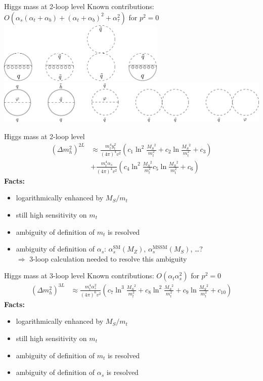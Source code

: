 \documentclass[hyperref={pdfpagelabels=false},ngerman]{beamer}
\newcommand{\MS}{\ensuremath{M_S}}
\renewcommand{\emph}{\textbf}
\newcommand{\SM}{\ensuremath{\text{SM}}}
\newcommand{\MSSM}{\ensuremath{\text{MSSM}}}
\newcommand{\at}{\alpha_t}
\newcommand{\ab}{\alpha_b}
\newcommand{\atau}{\alpha_\tau}
\newcommand{\as}{\alpha_s}
\begin{document}
\begin{frame}{Higgs mass at 2-loop level}
  Known contributions: $O(\as (\at + \ab) + (\at+\ab)^2 + \atau^2)$ for $p^2 = 0$
  \\[1em]
  \includegraphics[width=0.6\textwidth]{images/atas}\\[1em]
  \includegraphics[width=\textwidth]{images/atat}
\end{frame}

\begin{frame}{Higgs mass at 2-loop level}
  \begin{align*}
    (\Delta m_h^2)^{2L} &\approx
    \frac{m_t^4 y_t^2}{(4\pi)^4 v^2} \left(
      c_1 \ln^2\frac{\MS^2}{m_t^2}
      + c_2 \ln\frac{\MS^2}{m_t^2}
      + c_3
    \right) \\
    & +
    \frac{m_t^4 \as}{(4\pi)^4 v^2} \left(
      c_4 \ln^2\frac{\MS^2}{m_t^2}
      c_5 \ln\frac{\MS^2}{m_t^2}
      + c_6
    \right)
  \end{align*}
  \emph{Facts:}
  \begin{itemize}
  \item logarithmically enhanced by $\MS / m_t$
  \item still high sensitivity on $m_t$
  \item ambiguity of definition of $m_t$ is resolved
  \item ambiguity of definition of $\as$: $\as^\SM(M_Z)$, $\as^\MSSM(\MS)$, \ldots ? \\
    $\Rightarrow$ 3-loop calculation needed to resolve this ambiguity
  \end{itemize}
\end{frame}

\begin{frame}{Higgs mass at 3-loop level}
  Known contributions: $O(\at\as^2)$ for $p^2 = 0$
  \begin{align*}
    (\Delta m_h^2)^{3L} &\approx
    \frac{m_t^4 \as^2}{(4\pi)^6 v^2} \left(
      c_7 \ln^3\frac{\MS^2}{m_t^2}
      + c_8 \ln^2\frac{\MS^2}{m_t^2}
      + c_9 \ln\frac{\MS^2}{m_t^2}
      + c_{10}
    \right)
  \end{align*}
  \emph{Facts:}
  \begin{itemize}
  \item logarithmically enhanced by $\MS / m_t$
  \item still high sensitivity on $m_t$
  \item ambiguity of definition of $m_t$ is resolved
  \item ambiguity of definition of $\as$ is resolved
  \end{itemize}
\end{frame}
\end{document}
